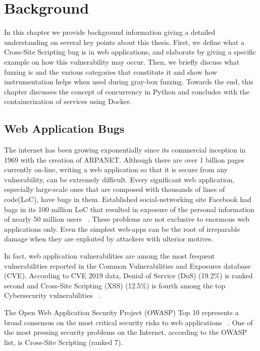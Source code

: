 \chapter{Background}
\label{sec:background}
\minitoc
\vspace*{1cm}

In this chapter we provide background information giving a detailed understanding on several key points about this thesis. First, we define what a Cross-Site Scripting bug is in web applications, and elaborate by giving a specific example on how this vulnerability may occur. Then, we briefly discuss what fuzzing is and the various categories that constitute it and show how instrumentation helps when used during gray-box fuzzing. Towards the end, this chapter discusses the concept of concurrency in Python and concludes with the containerization of services using Docker.

\section{Web Application Bugs}
The internet has been growing exponentially since its commercial inception in 1969 with the creation of ARPANET. Although there are over 1 billion pages currently on-line, writing a web application so that it is secure from any vulnerability, can be extremely difficult. Every significant web application, especially large-scale ones that are composed with thousands of lines of code(LoC), have bugs in them. Established social-networking site Facebook had bags in its 100 million LoC that resulted in exposure of the personal information of nearly 50 million users ~\cite{facebook_data_breach,facebook_loc}. These problems are not exclusive to enormous web applications only. Even the simplest web-apps can be the root of irreparable damage when they are exploited by attackers with ulterior motives. 

In fact, web application vulnerabilities are among the most frequent vulnerabilities reported in the Common Vulnerabilities and Exposures database (CVE). According to CVE 2019 data, Denial of Service  (DoS) (19.2\%) is ranked second and Cross-Site Scripting (XSS) (12.5\%) is fourth among the top Cybersecurity vulnerabilities ~\cite{cve}.

The Open Web Application Security Project (OWASP) Top 10 represents a broad consensus on the most critical security risks to web applications ~\cite{owasp2017}. One of the most pressing security problems on the Internet, according to the OWASP list, is Cross-Site Scripting (ranked 7).

